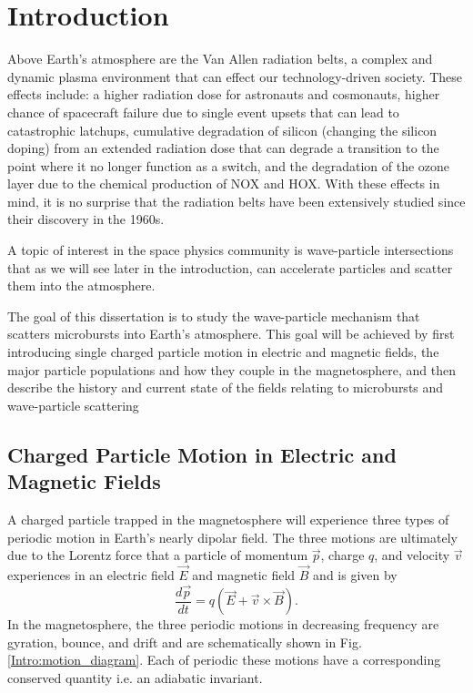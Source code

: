 \chapter{Introduction}\label{CH:introduction}
Above Earth's atmosphere are the Van Allen radiation belts, a complex and dynamic plasma environment that can effect our technology-driven society. These effects include: a higher radiation dose for astronauts and cosmonauts, higher chance of spacecraft failure due to single event upsets that can lead to catastrophic latchups, cumulative degradation of silicon (changing the silicon doping) from an extended radiation dose that can degrade a transition to the point where it no longer function as a switch, and the degradation of the ozone layer due to the chemical production of NOX and HOX. With these effects in mind, it is no surprise that the radiation belts have been extensively studied since their discovery in the 1960s.

A topic of interest in the space physics community is wave-particle intersections that as we will see later in the introduction, can accelerate particles and scatter them into the atmosphere.

The goal of this dissertation is to study the wave-particle mechanism that scatters microbursts into Earth's atmosphere. This goal will be achieved by first introducing single charged particle motion in electric and magnetic fields, the major particle populations and how they couple in the magnetosphere, and then describe the history and current state of the fields relating to microbursts and wave-particle scattering

\section{Charged Particle Motion in Electric and Magnetic Fields}\label{Intro:particle_motion}
A charged particle trapped in the magnetosphere will experience three types of periodic motion in Earth's nearly dipolar field. The three motions are ultimately due to the Lorentz force that a particle of momentum $\vec{p}$, charge $q$, and velocity $\vec{v}$ experiences in an electric field $\vec{E}$ and magnetic field $\vec{B}$ and is given by
\begin{equation} \label{Intro:Lorentz}
\frac{d\vec{p}}{dt} = q(\vec{E} + \vec{v} \times \vec{B}).
\end{equation} In the magnetosphere, the three periodic motions in decreasing frequency are gyration, bounce, and drift and are schematically shown in Fig. \ref{Intro:motion_diagram}. Each of periodic these motions have a corresponding conserved quantity i.e. an adiabatic invariant. 

